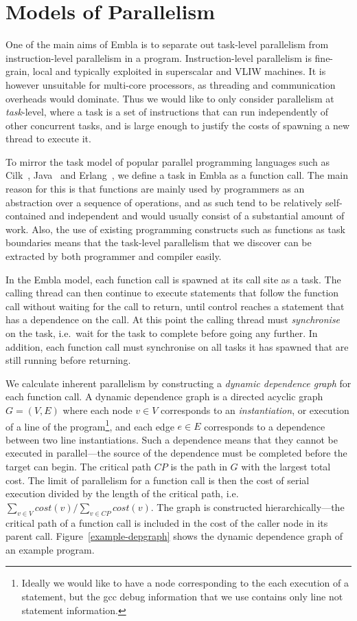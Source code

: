 \section{Models of Parallelism} \label{smethod}

One of the main aims of Embla is to separate out task-level parallelism from instruction-level parallelism in a program.
Instruction-level parallelism is fine-grain, local and typically exploited in superscalar and VLIW machines.
It is however unsuitable for multi-core processors, as threading and communication overheads would dominate.
Thus we would like to only consider parallelism at \emph{task}-level, where a task is a set of instructions that can run independently of other concurrent tasks, and is large enough to justify the costs of spawning a new thread to execute it.

To mirror the task model of popular parallel programming languages such as Cilk~\cite{blumofe96cilk}, Java~\cite{lea00java} and Erlang~\cite{armstrong07programming}, we define a task in Embla as a function call.
The main reason for this is that functions are mainly used by programmers as an abstraction over a sequence of operations, and as such tend to be relatively self-contained and independent and would usually consist of a substantial amount of work.
Also, the use of existing programming constructs such as functions as task boundaries means that the task-level parallelism that we discover can be extracted by both programmer and compiler easily.

In the Embla model, each function call is spawned at its call site as a task.
The calling thread can then continue to execute statements that follow the function call without waiting for the call to return, until control reaches a statement that has a dependence on the call.
At this point the calling thread must \emph{synchronise} on the task, i.e.\ wait for the task to complete before going any further.
In addition, each function call must synchronise on all tasks it has spawned that are still running before returning.

We calculate inherent parallelism by constructing a \emph{dynamic dependence graph} for each function call.
A dynamic dependence graph is a directed acyclic graph $G=(V,E)$ where each node $v\in V$ corresponds to an \emph{instantiation}, or execution of a line of the program\footnote{Ideally we would like to have a node corresponding to the each execution of a statement, but the gcc debug information that we use contains only line not statement information.}, and each edge $e\in E$ corresponds to a dependence between two line instantiations.
Such a dependence means that they cannot be executed in parallel---the source of the dependence must be completed before the target can begin.
The critical path $\mathit{CP}$ is the path in $G$ with the largest total cost.
The limit of parallelism for a function call is then the cost of serial execution divided by the length of the critical path, i.e. $\sum_{v\in V} cost(v)/\sum_{v\in \mathit{CP}} cost(v)$.
The graph is constructed hierarchically---the critical path of a function call is included in the cost of the caller node in its parent call.
Figure~\ref{example-depgraph} shows the dynamic dependence graph of an example program.

